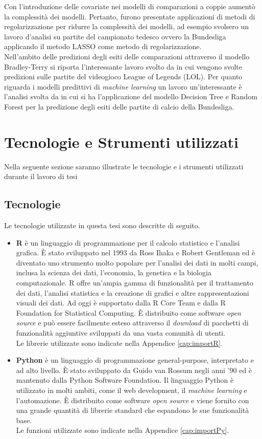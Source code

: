 Con l'introduzione delle covariate nei modelli di comparazioni a coppie aumentò la complessità dei modelli. Pertanto, furono presentate applicazioni di metodi di regolarizzazione per ridurre la complessità dei modelli, ad esempio \textcite{schauberger2019btllasso} svolsero un lavoro d'analisi su partite del campionato tedesco ovvero la Bundesliga applicando il metodo LASSO come metodo di regolarizzazione.\\
Nell'ambito delle predizioni degli esiti delle comparazioni attraverso il modello Bradley-Terry si riporta l’interessante lavoro svolto da \textcite{kang2015poisson} in cui vengono svolte predizioni sulle partite del videogioco League of Legends (LOL). Per quanto riguarda i modelli predittivi di \emph{machine learning} un lavoro un'interessante è l'analisi svolta da \textcite{xu2021prediction} in cui si ha l'applicazione del modello Decision Tree e Random Forest per la predizione degli esiti delle partite di calcio della Bundesliga.

\section{Tecnologie e Strumenti utilizzati}
Nella seguente sezione saranno illustrate le tecnologie e i strumenti utilizzati durante il lavoro di tesi 
\subsection{Tecnologie}
Le tecnologie utilizzate in questa tesi sono descritte di seguito.
\begin{itemize}
	\item \textbf{R} \autocite{R-language} è un linguaggio di programmazione per il calcolo statistico e l'analisi grafica. È stato sviluppato nel 1993 da Ross Ihaka e Robert Gentleman ed è diventato uno strumento molto popolare per l'analisi dei dati in molti campi, inclusa la scienza dei dati, l'economia, la genetica e la biologia computazionale. R offre un'ampia gamma di funzionalità per il trattamento dei dati, l'analisi statistica e la creazione di grafici e altre rappresentazioni visuali dei dati. Ad oggi è supportato dalla R Core Team e dalla R Foundation for Statistical Computing. È distribuito come software \emph{open source} e può essere facilmente esteso attraverso il \emph{download} di pacchetti di funzionalità aggiuntive sviluppati da una vasta comunità di utenti.\\
	Le librerie utilizzate sono indicate nella Appendice \ref{cap:importR}.
	\item \textbf{Python} \autocite{van2003introduction} è un linguaggio di programmazione general-purpose, interpretato e ad alto livello. È stato sviluppato da Guido van Rossum negli anni '90 ed è mantenuto dalla Python Software Foundation. Il linguaggio Python è utilizzato in molti ambiti, come il web development, il \emph{machine learning} e l'automazione. È distribuito come software \emph{open source} e viene fornito con una grande quantità di librerie standard che espandono le sue funzionalità base.\\
	Le funzioni utilizzate sono indicate nella Appendice \ref{cap:importPy}.
\end{itemize}


